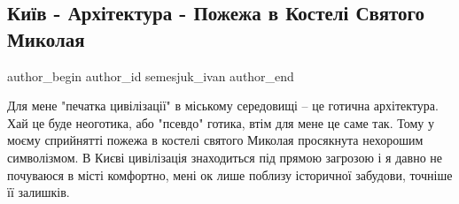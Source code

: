  
 
 
 
 
 
\subsection{Київ - Архітектура - Пожежа в Костелі Святого Миколая}
\label{sec:06_09_2021.fb.semesjuk_ivan.1.kiev_pozhar_kostel_arhitektura}
 
\ifcmt
 author_begin
   author_id semesjuk_ivan
 author_end
\fi

Для мене "печатка цивілізації" в міському середовищі – це готична архітектура.
Хай це буде неоготика, або "псевдо" готика, втім для мене це саме так. Тому у
моєму сприйнятті пожежа в костелі святого Миколая просякнута нехорошим
символізмом. В Києві цивілізація знаходиться під прямою загрозою і я давно не
почуваюся в місті комфортно, мені ок лише поблизу історичної забудови, точніше
її залишків. 

